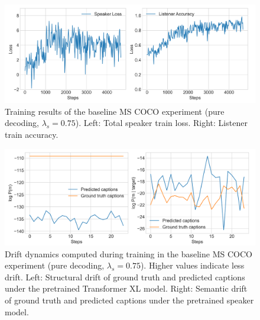 \begin{figure}
	\centering
	\includegraphics[width=\linewidth]{images/coco_refgame_4000_pure_075_random.png}
	\caption{Training results of the baseline MS COCO experiment (pure decoding, $\lambda_s = 0.75$). Left: Total speaker train loss. Right: Listener train accuracy.}
	\label{fig:coco_baseline_075_speaker_loss_listener_acc}
\end{figure}


\begin{figure}
	\centering
	\includegraphics[width=\linewidth]{images/coco_structural_semantic_drift_4000_pure_075_random.png}
	\caption{Drift dynamics computed during training in the baseline MS COCO experiment (pure decoding, $\lambda_s = 0.75$). Higher values indicate less drift. Left: Structural drift of ground truth and predicted captions under the pretrained Transformer XL model. Right: Semantic drift of ground truth and predicted captions under the pretrained speaker model.\protect\footnotemark}
	\label{fig:coco_baseline_075_str_drift}
\end{figure}

